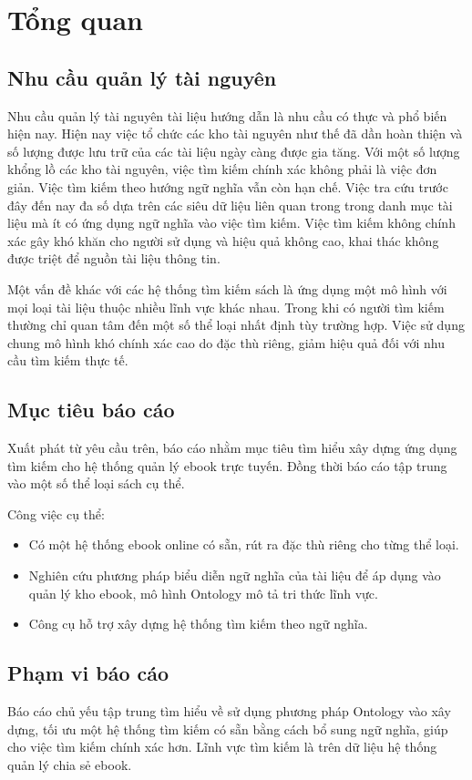 \chapter{Tổng quan}

\section{Nhu cầu quản lý tài nguyên}

Nhu cầu quản lý tài nguyên tài liệu hướng dẫn là nhu cầu có thực và phổ biến hiện nay. Hiện nay việc tổ chức các kho tài nguyên như thế đã dần hoàn thiện và số lượng được lưu trữ của các tài liệu ngày càng được gia tăng.
Với một số lượng khổng lồ các kho tài nguyên, việc tìm kiếm chính xác không phải là việc đơn giản. Việc tìm kiếm theo hướng ngữ nghĩa vẫn còn hạn chế. 
Việc tra cứu trước đây đến nay đa số dựa trên các siêu dữ liệu liên quan trong trong danh mục tài liệu mà ít có ứng dụng ngữ nghĩa vào việc tìm kiếm. Việc tìm kiếm không chính xác gây khó khăn cho người sử dụng và hiệu quả không cao, khai thác không được triệt để nguồn tài liệu thông tin.

Một vấn đề khác với các hệ thống tìm kiếm sách là ứng dụng một mô hình với mọi loại tài liệu thuộc nhiều lĩnh vực khác nhau. Trong khi có người tìm kiếm thường chỉ quan tâm đến một số thể loại nhất định tùy trường hợp. Việc sử dụng chung mô hình khó chính xác cao do đặc thù riêng, giảm hiệu quả đối với nhu cầu tìm kiếm thực tế.


\section{Mục tiêu báo cáo}

Xuất phát từ yêu cầu trên, báo cáo nhằm mục tiêu tìm hiểu xây dựng ứng dụng tìm kiếm cho hệ thống quản lý ebook trực tuyến. Đồng thời báo cáo tập trung vào một số thể loại sách cụ thể. 

Công việc cụ thể:
\begin{itemize}
    \item Có một hệ thống ebook online có sẵn, rút ra đặc thù riêng cho từng thể loại.
    \item Nghiên cứu phương pháp biểu diễn ngữ nghĩa của tài liệu để áp dụng vào quản lý kho ebook, mô hình Ontology mô tả tri thức lĩnh vực.
    \item Công cụ hỗ trợ xây dựng hệ thống tìm kiếm theo ngữ nghĩa.
\end{itemize}

\section{Phạm vi báo cáo}

Báo cáo chủ yếu tập trung tìm hiểu về sử dụng phương pháp Ontology vào xây dựng, tối ưu một hệ thống tìm kiếm có sẵn bằng cách bổ sung ngữ nghĩa, giúp cho việc tìm kiếm chính xác hơn. Lĩnh vực tìm kiếm là trên dữ liệu hệ thống quản lý chia sẻ ebook.


